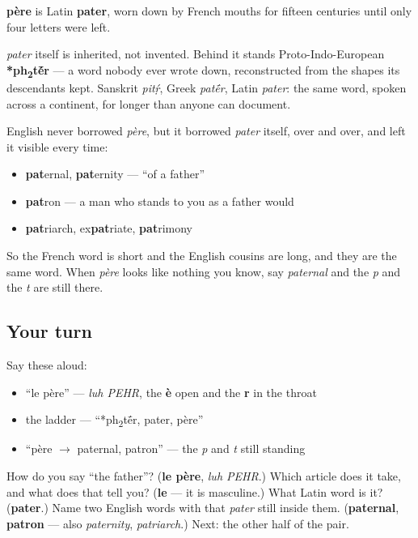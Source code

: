 \begin{cousinweb}
\textbf{père} is Latin \textbf{pater}, worn down by French mouths for fifteen centuries until only four letters were left.

\emph{pater} itself is inherited, not invented. Behind it stands Proto-Indo-European \textbf{*ph\textsubscript{2}t\'{\={e}}r} — a word nobody ever wrote down, reconstructed from the shapes its descendants kept. Sanskrit \emph{pitṛ́}, Greek \emph{pat\'{\={e}}r}, Latin \emph{pater}: the same word, spoken across a continent, for longer than anyone can document.

English never borrowed \emph{père}, but it borrowed \emph{pater} itself, over and over, and left it visible every time:

\begin{itemize}
\raggedright
  \item \textbf{pat}ernal, \textbf{pat}ernity — \textquotedblleft{}of a father\textquotedblright{}
  \item \textbf{pat}ron — a man who stands to you as a father would
  \item \textbf{pat}riarch, ex\textbf{pat}riate, \textbf{pat}rimony
\end{itemize}

So the French word is short and the English cousins are long, and they are the same word. When \emph{père} looks like nothing you know, say \emph{paternal} and the \emph{p} and the \emph{t} are still there.
\end{cousinweb}

\subsection*{Your turn}
Say these aloud:

\begin{itemize}
\raggedright
  \item \textquotedblleft{}le père\textquotedblright{} — \emph{luh PEHR}, the \textbf{è} open and the \textbf{r} in the throat
  \item the ladder — \textquotedblleft{}*ph\textsubscript{2}t\'{\={e}}r, pater, père\textquotedblright{}
  \item \textquotedblleft{}père $\to$ paternal, patron\textquotedblright{} — the \emph{p} and \emph{t} still standing
\end{itemize}

\begin{tcolorbox}[breakable,colback=teal!4,colframe=teal!35!black,title={Before you move on}]
How do you say \textquotedblleft{}the father\textquotedblright{}? (\textbf{le père}, \emph{luh PEHR}.) Which article does it take, and what does that tell you? (\textbf{le} — it is masculine.) What Latin word is it? (\textbf{pater}.) Name two English words with that \emph{pater} still inside them. (\textbf{paternal}, \textbf{patron} — also \emph{paternity}, \emph{patriarch}.) Next: the other half of the pair.
\end{tcolorbox}
